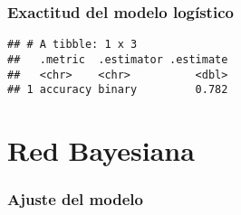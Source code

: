 \documentclass[
]{article}
\begin{document}
\hypertarget{exactitud-del-modelo-loguxedstico}{%
\subsubsection{Exactitud del modelo
logístico}\label{exactitud-del-modelo-loguxedstico}}

\begin{verbatim}
## # A tibble: 1 x 3
##   .metric  .estimator .estimate
##   <chr>    <chr>          <dbl>
## 1 accuracy binary         0.782
\end{verbatim}

\hypertarget{red-bayesiana}{%
\section{Red Bayesiana}\label{red-bayesiana}}

\hypertarget{ajuste-del-modelo}{%
\subsubsection{Ajuste del modelo}\label{ajuste-del-modelo}}
\end{document}
